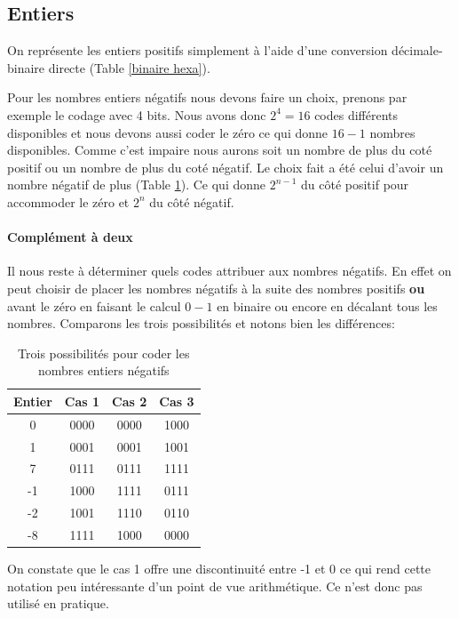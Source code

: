 \subsection{Entiers} 
On représente les entiers positifs simplement à l'aide d'une conversion décimale-binaire directe (Table \ref{binaire hexa}).

Pour les nombres entiers négatifs nous devons faire un choix, prenons par exemple le codage avec 4 bits. Nous avons donc $2^4 = 16$ codes différents disponibles et nous devons aussi coder le zéro ce qui donne $16 - 1$ nombres disponibles. Comme c'est impaire nous aurons soit un nombre de plus du coté positif ou un nombre de plus du coté négatif. Le choix fait a été celui d'avoir un nombre négatif de plus (Table \ref{entiers négatifs}). Ce qui donne $2^{n-1}$ du côté positif pour accommoder le zéro et $2^n$ du côté négatif.

\paragraph{Complément à deux}
Il nous reste à déterminer quels codes attribuer aux nombres négatifs. En effet on peut choisir de placer les nombres négatifs à la suite des nombres positifs \textbf{ou} avant le zéro en faisant le calcul $0-1$ en binaire ou encore en décalant tous les nombres. Comparons les trois possibilités et notons bien les différences:

\begin{table}[!htbp]
\begin{center}
{\selectfont
\begin{tabular}{|c|c|c|c|}
\hline 
Entier & Cas 1 & Cas 2 & Cas 3\\
\hline  
\hline 
0 & 0000 & 0000 & 1000\\
\hline 
1 & 0001 & 0001 & 1001\\
\hline
7 & 0111 & 0111 & 1111\\
\hline
-1 & 1000 & 1111 & 0111\\
\hline
-2 & 1001 & 1110 & 0110\\
\hline
-8 & 1111 & 1000 & 0000\\
\hline
\end{tabular}
}
\end{center}
\caption{Trois possibilités pour coder les nombres entiers négatifs \label{entiers négatifs}}
\end{table}

On constate que le cas 1 offre une discontinuité entre -1 et 0 ce qui rend cette notation peu intéressante d'un point de vue arithmétique. Ce n'est donc pas utilisé en pratique.

